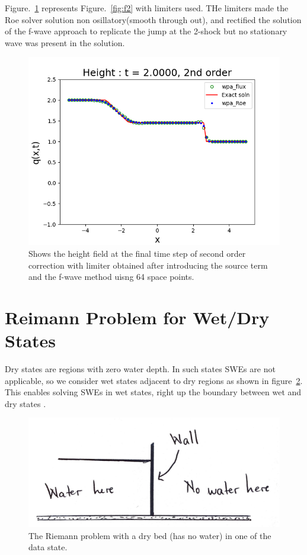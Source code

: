 \documentclass[12pt,a4paper]{article}
\begin{document}
	\noindent Figure.~\ref{fig:f2lim} represents Figure.~\ref{fig:f2}  with limiters used. THe limiters made the Roe solver solution non osillatory(smooth through out), and rectified the solution of the f-wave approach to replicate the jump at the 2-shock but no stationary wave was present in the solution.
\begin{figure}[H]
	\centering
	\includegraphics[width=0.85\linewidth]{images/2lim}
	\caption{Shows the height field at the final time step of second order correction with limiter obtained after introducing the source term and the f-wave method uisng 64 space points.}
	\label{fig:f2lim}
\end{figure}
	\section{Reimann Problem for Wet/Dry States}
	
	Dry states are regions with zero water depth. In such states SWEs are not applicable, so we consider wet states adjacent to dry regions as shown in figure~\ref{fig:dry-bed}. This enables solving SWEs in wet states, right up the boundary between wet and dry states \citep{toro2001shock}.
	\begin{figure}[H]
		\centering
		\includegraphics[width=0.7\linewidth]{images/db}
		\caption{ The Riemann problem with a dry bed (has no water) in one of the data state.}
		\label{fig:dry-bed}
	\end{figure}
	
\end{document}
